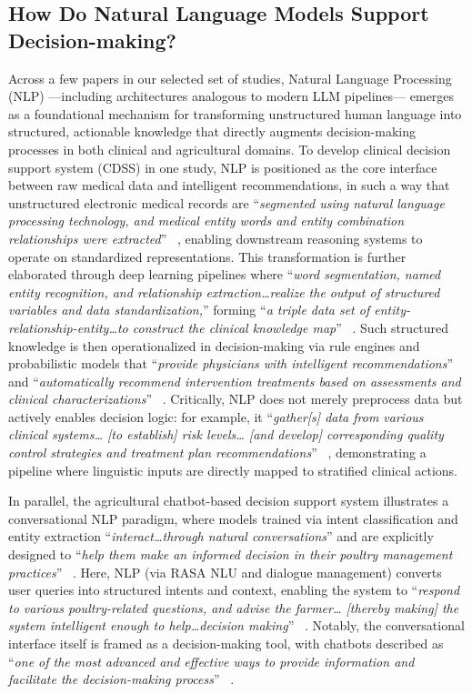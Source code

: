 \documentclass{sfuthesis}
\begin{document}
\subsection{How Do Natural Language Models Support Decision-making?}
Across a few papers in our selected set of studies, Natural Language Processing (NLP) —including architectures analogous to modern LLM pipelines— emerges as a foundational mechanism for transforming unstructured human language into structured, actionable knowledge that directly augments decision-making processes in both clinical and agricultural domains. To develop clinical decision support system (CDSS) in one study, NLP is positioned as the core interface between raw medical data and intelligent recommendations, in such a way that unstructured electronic medical records are “\textit{segmented using natural language processing technology, and medical entity words and entity combination relationships were extracted}” ~\cite{miao2025construction}, enabling downstream reasoning systems to operate on standardized representations. This transformation is further elaborated through deep learning pipelines where “\textit{word segmentation, named entity recognition, and relationship extraction…realize the output of structured variables and data standardization,}” forming “\textit{a triple data set of entity-relationship-entity…to construct the clinical knowledge map}” ~\cite{miao2025construction}. Such structured knowledge is then operationalized in decision-making via rule engines and probabilistic models that “\textit{provide physicians with intelligent recommendations}” and “\textit{automatically recommend intervention treatments based on assessments and clinical characterizations}” ~\cite{miao2025construction}. Critically, NLP does not merely preprocess data but actively enables decision logic: for example, it “\textit{gather[s] data from various clinical systems… [to establish] risk levels… [and develop] corresponding quality control strategies and treatment plan recommendations}” ~\cite{miao2025construction}, demonstrating a pipeline where linguistic inputs are directly mapped to stratified clinical actions.\par 
In parallel, the agricultural chatbot-based decision support system illustrates a conversational NLP paradigm, where models trained via intent classification and entity extraction “\textit{interact…through natural conversations}” and are explicitly designed to “\textit{help them make an informed decision in their poultry management practices}” ~\cite{Shapa2021PoultryFarmers}. Here, NLP (via RASA NLU and dialogue management) converts user queries into structured intents and context, enabling the system to “\textit{respond to various poultry-related questions, and advise the farmer… [thereby making] the system intelligent enough to help…decision making}” ~\cite{Shapa2021PoultryFarmers}. Notably, the conversational interface itself is framed as a decision-making tool, with chatbots described as “\textit{one of the most advanced and effective ways to provide information and facilitate the decision-making process}” ~\cite{Shapa2021PoultryFarmers}.\par 
\end{document}
